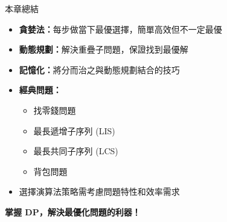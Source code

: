 \documentclass{beamer}
\begin{document}
\begin{frame}{本章總結}
\begin{itemize}
    \item \textbf{貪婪法：}每步做當下最優選擇，簡單高效但不一定最優
    \item \textbf{動態規劃：}解決重疊子問題，保證找到最優解
    \item \textbf{記憶化：}將分而治之與動態規劃結合的技巧
    \item \textbf{經典問題：}
    \begin{itemize}
        \item 找零錢問題
        \item 最長遞增子序列 (LIS)
        \item 最長共同子序列 (LCS)
        \item 背包問題
    \end{itemize}
    \item 選擇演算法策略需考慮問題特性和效率需求
\end{itemize}

\vspace{1em}
\begin{center}
    \textbf{掌握 DP，解決最優化問題的利器！}
\end{center}
\end{frame}
\end{document}

